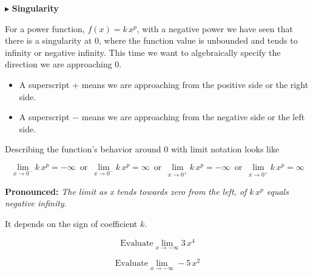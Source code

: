 \documentclass{ximera}
\begin{document}
$\blacktriangleright$  \textbf{Singularity}



For a power function, $f(x) = k \, x^p$, with a negative power we have seen that there is a singularity at $0$, where the function value is unbounded and tends to infinity or negative infinity.  This time we want to algebraically specify the direction we are approaching $0$.  

\begin{itemize}
\item A superscript $+$ means we are approaching from the positive side or the right side.
\item A superscript $-$ means we are approaching from the negative side or the left side.
\end{itemize}


Describing the function's behavior around $0$ with limit notation looks like




\[    \lim_{x \to 0^-} k \, x^p =  -\infty  \,   \text{ or }  \,     \lim_{x \to 0^-} k \, x^p = \infty   \,   \text{ or }  \,      \lim_{x \to 0^+} k \, x^p =  -\infty  \,   \text{ or }  \,     \lim_{x \to 0^+} k \, x^p = \infty   \]




\textbf{Pronounced:} \textit{The limit as x tends towards zero from the left, of $k \, x^p$ equals negative infinity}.

It depends on the sign of coefficient $k$.









\begin{question}

\[ \text{Evaluate} \lim_{x \to -\infty} 3 \, x^4 \]

\begin{multipleChoice}
\choice {$-\infty$}
\choice [correct]{$\infty$}
\end{multipleChoice}
\end{question}






\begin{question}

\[ \text{Evaluate} \lim_{x \to -\infty} -5 \, x^2 \]

\begin{multipleChoice}
\choice [correct]{$-\infty$}
\choice {$\infty$}
\end{multipleChoice}
\end{question}
\end{document}
